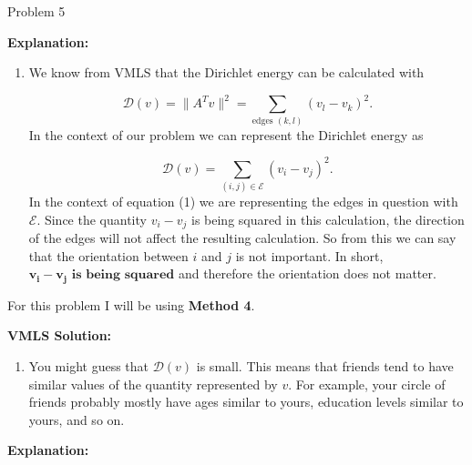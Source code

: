 \begin{problem}{Problem 5}
\begin{Highlight}
        \noindent \textbf{Explanation:}

        \begin{enumerate}[label = (\alph*)]
            \item We know from VMLS that the Dirichlet energy can be calculated with 
            
            \begin{equation*}
                \mathcal{D}(v) = \|A^{T}v\|^{2} = \sum_{\text{edges } (k,l)} (v_{l} - v_{k})^{2}.
            \end{equation*}
            In the context of our problem we can represent the Dirichlet energy as

            \setcounter{equation}{0}
            \begin{equation}
                \mathcal{D}(v) = \sum_{(i,j) \in \mathcal{E}} (v_{i} - v_{j})^{2}.
            \end{equation}
            In the context of equation (1) we are representing the edges in question with $\mathcal{E}$. Since the quantity $v_{i} - v_{j}$ is being squared in this calculation, the direction of the 
            edges will not affect the resulting calculation. So from this we can say that the orientation between $i$ and $j$ is not important. In short, $\mathbf{v_{i} - v_{j}} \textbf{ is being squared}$ 
            and therefore the orientation does not matter.
        \end{enumerate}
    \end{Highlight}

    \begin{Highlight}
        For this problem I will be using \textbf{Method 4}. \vspace*{1em}

        \noindent \textbf{VMLS Solution:} 

        \begin{enumerate}[label = (\alph*), start = 2]
            \item You might guess that $\mathcal{D}(v)$ is small. This means that friends tend to have similar values of the quantity represented by $v$. For example, your circle of friends probably mostly 
            have ages similar to yours, education levels similar to yours, and so on.
        \end{enumerate}

        \noindent \textbf{Explanation:} 


\end{Highlight}
\end{problem}
